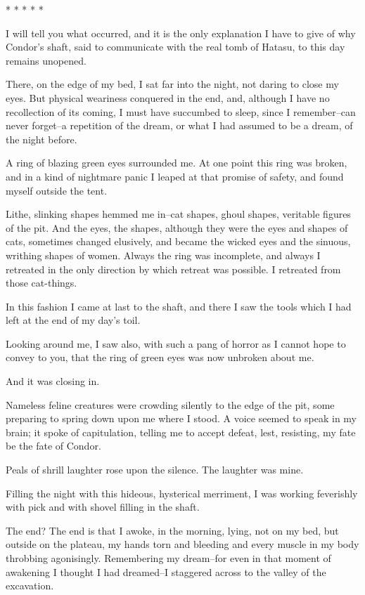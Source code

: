        *       *       *       *       *

I will tell you what occurred, and it is the only explanation I have
to give of why Condor's shaft, said to communicate with the real tomb
of Hatasu, to this day remains unopened.

There, on the edge of my bed, I sat far into the night, not daring to
close my eyes. But physical weariness conquered in the end, and,
although I have no recollection of its coming, I must have succumbed
to sleep, since I remember--can never forget--a repetition of the
dream, or what I had assumed to be a dream, of the night before.

A ring of blazing green eyes surrounded me. At one point this ring was
broken, and in a kind of nightmare panic I leaped at that promise of
safety, and found myself outside the tent.

Lithe, slinking shapes hemmed me in--cat shapes, ghoul shapes,
veritable figures of the pit. And the eyes, the shapes, although they
were the eyes and shapes of cats, sometimes changed elusively, and
became the wicked eyes and the sinuous, writhing shapes of women.
Always the ring was incomplete, and always I retreated in the only
direction by which retreat was possible. I retreated from those
cat-things.

In this fashion I came at last to the shaft, and there I saw the tools
which I had left at the end of my day's toil.

Looking around me, I saw also, with such a pang of horror as I cannot
hope to convey to you, that the ring of green eyes was now unbroken
about me.

And it was closing in.

Nameless feline creatures were crowding silently to the edge of the
pit, some preparing to spring down upon me where I stood. A voice
seemed to speak in my brain; it spoke of capitulation, telling me to
accept defeat, lest, resisting, my fate be the fate of Condor.

Peals of shrill laughter rose upon the silence. The laughter was mine.

Filling the night with this hideous, hysterical merriment, I was
working feverishly with pick and with shovel filling in the shaft.

The end? The end is that I awoke, in the morning, lying, not on my
bed, but outside on the plateau, my hands torn and bleeding and every
muscle in my body throbbing agonisingly. Remembering my dream--for
even in that moment of awakening I thought I had dreamed--I staggered
across to the valley of the excavation.


